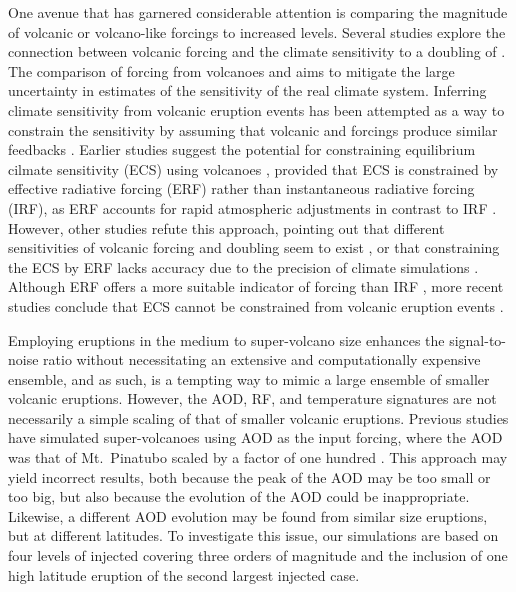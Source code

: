 \documentclass[draft]{agujournal2019}
\begin{document}
  One avenue that has garnered considerable attention is comparing the magnitude of
  volcanic or volcano-like forcings to increased  levels. Several studies
  explore the connection between volcanic forcing and the climate sensitivity to a
  doubling of 
  \cite{boer2007,marvel2016,merlis2014,ollila2016,richardson2019,salvi2022,wigley2005}.
  The comparison of forcing from volcanoes and  aims to mitigate the large
  uncertainty in estimates of the sensitivity of the real climate system. Inferring
  climate sensitivity from volcanic eruption events has been attempted as a way to
  constrain the sensitivity \cite{boer2007} by assuming that volcanic and 
  forcings produce similar feedbacks \cite{pauling2023}. Earlier studies suggest the
  potential for constraining equilibrium cilmate sensitivity (ECS) using volcanoes
  \cite{bender2010}, provided that ECS is constrained by effective radiative forcing
  (ERF) rather than instantaneous radiative forcing (IRF), as ERF accounts for rapid
  atmospheric adjustments in contrast to IRF \cite{richardson2019}. However, other
  studies refute this approach, pointing out that different sensitivities of volcanic
  forcing and  doubling seem to exist \cite{douglass2006}, or that constraining
  the ECS by ERF lacks accuracy due to the precision of climate simulations
  \cite{boer2007,salvi2022}. Although ERF offers a more suitable indicator of forcing
  than IRF \cite{marvel2016,richardson2019}, more recent studies conclude that ECS
  cannot be constrained from volcanic eruption events \cite{pauling2023}.

  Employing eruptions in the medium to super-volcano size enhances the signal-to-noise
  ratio without necessitating an extensive and computationally expensive ensemble, and
  as such, is a tempting way to mimic a large ensemble of smaller volcanic eruptions.
  However, the AOD, RF, and temperature signatures are not necessarily a simple scaling
  of that of smaller volcanic eruptions. Previous studies have simulated super-volcanoes
  using AOD as the input forcing, where the AOD was that of Mt.\ Pinatubo scaled by a
  factor of one hundred \cite{jones2005}. This approach may yield incorrect results,
  both because the peak of the AOD may be too small or too big, but also because the
  evolution of the AOD could be inappropriate. Likewise, a different AOD evolution may
  be found from similar size eruptions, but at different latitudes. To investigate this
  issue, our simulations are based on four levels of injected  covering three
  orders of magnitude and the inclusion of one high latitude eruption of the second
  largest injected  case.
\end{document}
